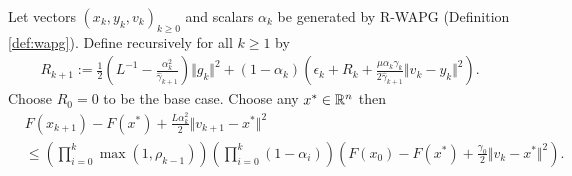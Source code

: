 \documentclass[12pt]{article}
\begin{document}
    \begin{proposition}\label{prop:wagp-convergence}
        Let vectors $(x_k, y_k, v_k)_{k \ge0}$ and scalars $\alpha_k$ be generated by R-WAPG (Definition \ref{def:wapg}). 
        Define recursively for all $k\ge1$ by 
        \begin{align*}
        R_{k + 1}
        := 
        \frac{1}{2}\left(
            L^{-1} - \frac{\alpha_k^2}{\hat \gamma_{k + 1}}
        \right)\Vert g_k\Vert^2
        + 
        (1 - \alpha_k)
        \left(
            \epsilon_k + R_k + 
            \frac{\mu\alpha_k\gamma_k}{2\hat \gamma_{k + 1}}
            \Vert v_k - y_k\Vert^2
        \right). 
        \end{align*}
        Choose $R_0= 0$ to be the base case. 
        Choose any $x^* \in \mathbb R^n$ then
        \begin{align*}
            & F(x_{k + 1}) - F(x^*) + \frac{L \alpha_k^2}{2}\Vert v_{k + 1} - x^*\Vert^2
            \\
            &\le 
            \left(
                \prod_{i = 0}^{k} \max(1, \rho_{k - 1})
            \right)
            \left(
                \prod_{i = 0}^{k} \left(1  - \alpha_i\right)
            \right)
            \left(
                F(x_0) - F(x^*) + \frac{\gamma_0}{2}\Vert v_k - x^*\Vert^2
            \right). 
        \end{align*}
    \end{proposition}
\end{document}
